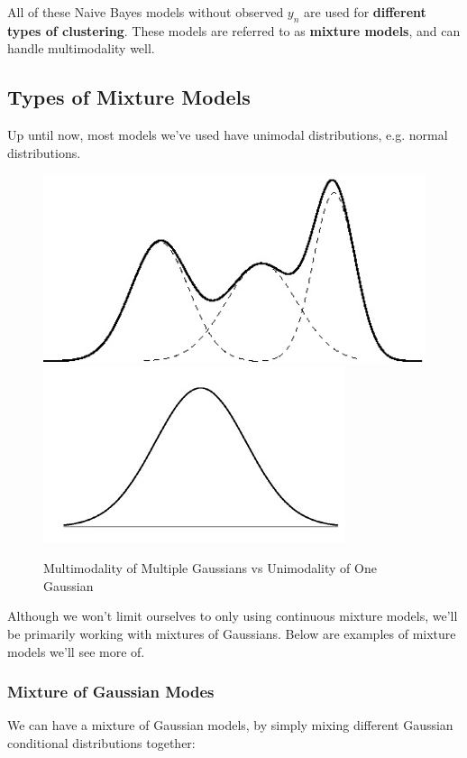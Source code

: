 \documentclass{article}
\begin{document}
All of these Naive Bayes models without observed $y_n$ are used for {\bf different types of clustering}. These models are referred to as {\bf mixture models}, and can handle  multimodality well.  

\subsection{Types of Mixture Models}
Up until now, most models we've used have unimodal distributions, e.g. normal distributions.

\begin{figure}[H]
\begin{center}
\includegraphics[scale=0.5]{multimodal.jpg}
\includegraphics[scale=0.5]{gaussian.jpg}
\caption{Multimodality of Multiple Gaussians vs Unimodality of One Gaussian}
\end{center}
\end{figure}   

Although we won't limit ourselves to only using continuous mixture models, we'll be primarily working with mixtures of Gaussians.  Below are examples of mixture models we'll see more of.

\subsubsection{Mixture of Gaussian Modes}
	We can have a mixture of Gaussian models, by simply mixing different Gaussian conditional distributions together:
\end{document}
